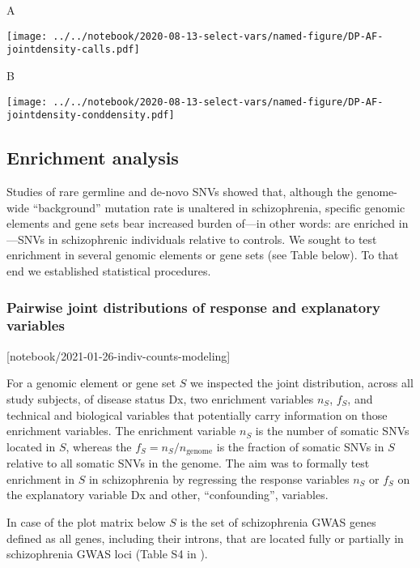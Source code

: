 \documentclass[letterpaper]{article}
\begin{document}
A

\texttt{[image: ../../notebook/2020-08-13-select-vars/named-figure/DP-AF-jointdensity-calls.pdf]}

B

\texttt{[image: ../../notebook/2020-08-13-select-vars/named-figure/DP-AF-jointdensity-conddensity.pdf]}

\subsection*{Enrichment analysis}


Studies of rare germline and de-novo SNVs showed that,
although the genome-wide ``background'' mutation rate is unaltered in
schizophrenia, specific genomic elements and gene sets bear increased burden
of---in other words: are enriched in---SNVs in schizophrenic individuals relative to
controls.  We sought to test enrichment in several genomic elements or gene
sets (see Table below).  To that end we established statistical procedures.

\subsubsection*{Pairwise joint distributions of response and explanatory variables}

[notebook/2021-01-26-indiv-counts-modeling]

For a genomic element or gene set  \(S\) we inspected the joint distribution,
across all study subjects, of disease status Dx, two enrichment variables
\(n_S\), \(f_S\), and technical and biological variables that potentially
carry information on those enrichment variables.  The enrichment variable
\(n_S\) is the number of somatic SNVs located in \(S\), whereas the \(f_S =
	n_S/n_\mathrm{genome}\) is the fraction of somatic SNVs in \(S\)
relative to all somatic SNVs in the genome.  The aim was to formally test
enrichment in \(S\) in schizophrenia by regressing the response variables
\(n_S\) or \(f_S\) on the explanatory variable Dx
and other, ``confounding'', variables.

In case of the plot matrix below \(S\) is the set of schizophrenia GWAS genes
defined as all genes, including their introns, that are located fully or
partially in schizophrenia GWAS loci (Table S4 in \cite{Pardinas2018}).
\end{document}
